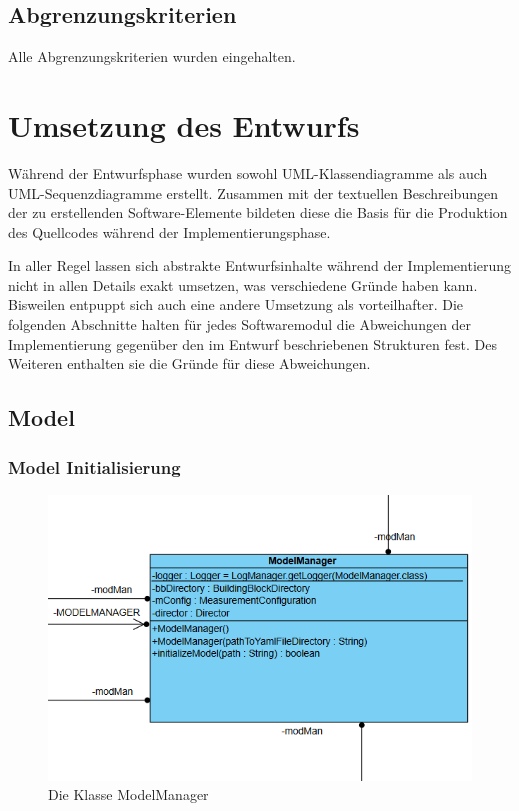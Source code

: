 \documentclass[parskip=full]{scrartcl}
\begin{document}
\subsection{Abgrenzungskriterien}

Alle Abgrenzungskriterien wurden eingehalten.

\clearpage
\section{Umsetzung des Entwurfs}

Während der Entwurfsphase wurden sowohl UML-Klassendiagramme als auch UML-Sequenzdiagramme erstellt. Zusammen mit der textuellen Beschreibungen der zu erstellenden Software-Elemente bildeten diese die Basis für die Produktion des Quellcodes während der Implementierungsphase. 

In aller Regel lassen sich abstrakte Entwurfsinhalte während der Implementierung nicht in allen Details exakt umsetzen, was verschiedene Gründe haben kann. Bisweilen entpuppt sich auch eine andere Umsetzung als vorteilhafter. Die folgenden Abschnitte halten für jedes Softwaremodul die Abweichungen der Implementierung gegenüber den im Entwurf beschriebenen Strukturen fest. Des Weiteren enthalten sie die Gründe für diese Abweichungen. 
\clearpage

\subsection{Model}

\subsubsection{Model Initialisierung}

\begin{figure}[htbp]
	\begin{center}
		\includegraphics[width = 14cm]{Grafiken/modman.PNG}
		\caption{Die Klasse ModelManager}
		\label{modman}
	\end{center}
\end{figure}
\end{document}
